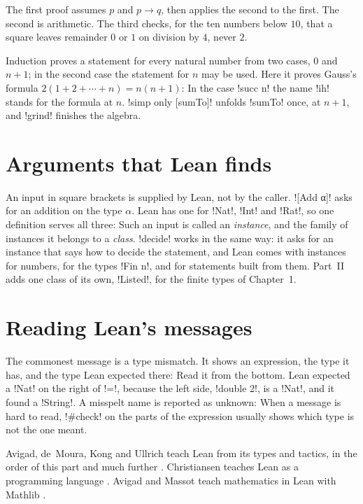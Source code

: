 The first proof assumes $p$ and $p\to q$, then applies the second to the
first. The second is arithmetic. The third checks, for the ten numbers below
$10$, that a square leaves remainder $0$ or $1$ on division by $4$, never $2$.

Induction proves a statement for every natural number from two cases, $0$
and $n+1$; in the second case the statement for $n$ may be used. Here it
proves Gauss's formula $2(1+2+\cdots+n)=n(n+1)$:
In the case \li!succ n! the name \li!ih! stands for the formula at $n$.
\li!simp only [sumTo]! unfolds \li!sumTo! once, at $n+1$, and \li!grind!
finishes the algebra.

\section*{Arguments that Lean finds}

An input in square brackets is supplied by Lean, not by the caller.
\li![Add α]! asks for an addition on the type $\alpha$. Lean has one for
\li!Nat!, \li!Int! and \li!Rat!, so one definition serves all three:
Such an input is called an \emph{instance}, and the family of instances it
belongs to a \emph{class}. \li!decide! works in the same way: it asks for an
instance that says how to decide the statement, and Lean comes with instances
for numbers, for the types \li!Fin n!, and for statements built from them.
Part~II adds one class of its own, \li!Listed!, for the finite types of
Chapter~1.

\section*{Reading Lean's messages}

The commonest message is a type mismatch. It shows an expression, the type
it has, and the type Lean expected there:
Read it from the bottom. Lean expected a \li!Nat! on the right of \li!=!,
because the left side, \li!double 2!, is a \li!Nat!, and it found a
\li!String!. A misspelt name is reported as unknown:
When a message is hard to read, \li!#check! on the parts of the expression
usually shows which type is not the one meant.

\begin{literatureconnection}[title={Further reading}]
Avigad, de~Moura, Kong and Ullrich teach Lean from its types and tactics, in
the order of this part and much further \cite{AvigadTPIL}. Christiansen
teaches Lean as a programming language \cite{ChristiansenFPIL}. Avigad and
Massot teach mathematics in Lean with Mathlib \cite{AvigadMassotMIL}.
\end{literatureconnection}
